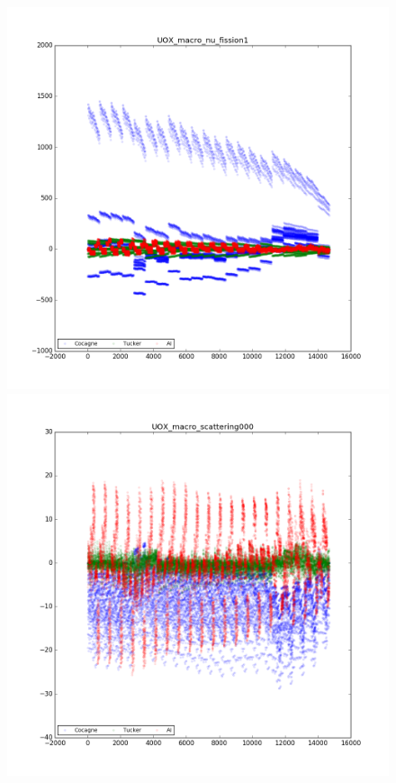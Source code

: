 \begin{center}
\begin{figure}[h]
\begin{minipage}[b]{0.5\linewidth}
   \end{minipage}
   \begin{minipage}[b]{0.5\linewidth}
      \centering \includegraphics[scale=0.3]{images/UOX/UOX_macro_nu_fission1.png}
   \end{minipage}
	 \begin{minipage}[b]{0.5\linewidth}
      \centering \includegraphics[scale=0.3]{images/UOX/UOX_macro_scattering000.png}

\end{minipage}
\end{figure}
\end{center}
